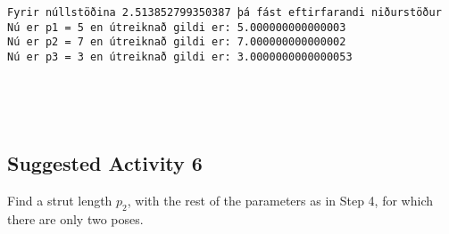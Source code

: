 \documentclass[11pt]{article}
\begin{document}
    \begin{Verbatim}[commandchars=\\\{\}]
Fyrir núllstöðina 2.513852799350387 þá fást eftirfarandi niðurstöður
Nú er p1 = 5 en útreiknað gildi er: 5.000000000000003
Nú er p2 = 7 en útreiknað gildi er: 7.000000000000002
Nú er p3 = 3 en útreiknað gildi er: 3.0000000000000053



    \end{Verbatim}

    \begin{center}
    \end{center}
    { \hspace*{\fill} \\}
    
    \subsection{Suggested Activity 6}\label{suggested-activity-6}

Find a strut length \(p_2\), with the rest of the parameters as in Step
4, for which there are only two poses.
\end{document}
